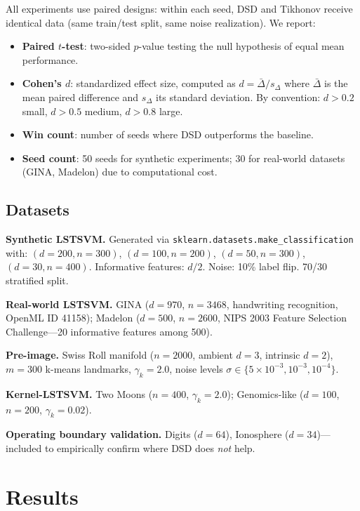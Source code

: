 \documentclass[journal]{IEEEtran}
\begin{document}
All experiments use paired designs: within each seed, DSD and Tikhonov receive identical data (same train/test split, same noise realization). We report:
\begin{itemize}
\item \textbf{Paired $t$-test}: two-sided $p$-value testing the null hypothesis of equal mean performance.
\item \textbf{Cohen's $d$}: standardized effect size, computed as $d = \bar{\Delta}/s_\Delta$ where $\bar{\Delta}$ is the mean paired difference and $s_\Delta$ its standard deviation. By convention: $d > 0.2$ small, $d > 0.5$ medium, $d > 0.8$ large.
\item \textbf{Win count}: number of seeds where DSD outperforms the baseline.
\item \textbf{Seed count}: 50 seeds for synthetic experiments; 30 for real-world datasets (GINA, Madelon) due to computational cost.
\end{itemize}

\subsection{Datasets}

\textbf{Synthetic LSTSVM.} Generated via \texttt{sklearn.datasets.make\_classification} with: $(d{=}200, n{=}300)$, $(d{=}100, n{=}200)$, $(d{=}50, n{=}300)$, $(d{=}30, n{=}400)$. Informative features: $d/2$. Noise: 10\% label flip. 70/30 stratified split.

\textbf{Real-world LSTSVM.} GINA ($d{=}970$, $n{=}3468$, handwriting recognition, OpenML ID 41158); Madelon ($d{=}500$, $n{=}2600$, NIPS 2003 Feature Selection Challenge---20 informative features among 500).

\textbf{Pre-image.} Swiss Roll manifold ($n{=}2000$, ambient $d{=}3$, intrinsic $d{=}2$), $m{=}300$ k-means landmarks, $\gamma_k{=}2.0$, noise levels $\sigma \in \{5{\times}10^{-3}, 10^{-3}, 10^{-4}\}$.

\textbf{Kernel-LSTSVM.} Two Moons ($n{=}400$, $\gamma_k{=}2.0$); Genomics-like ($d{=}100$, $n{=}200$, $\gamma_k{=}0.02$).

\textbf{Operating boundary validation.} Digits ($d{=}64$), Ionosphere ($d{=}34$)---included to empirically confirm where DSD does \emph{not} help.


\section{Results}
\label{sec:results}
\end{document}
